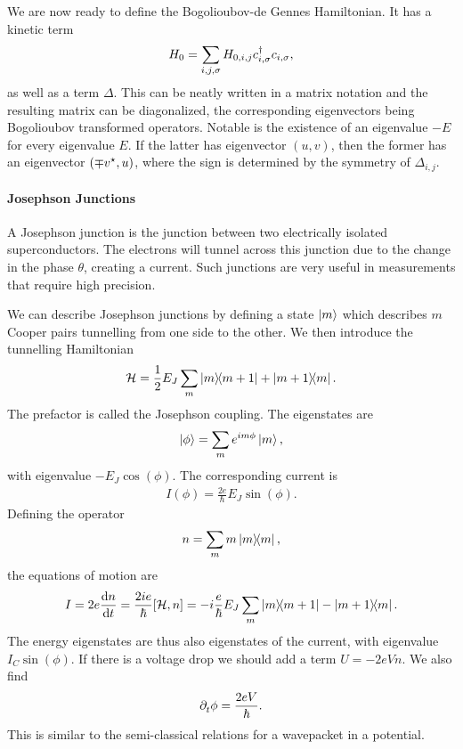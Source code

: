 We are now ready to define the Bogolioubov-de Gennes Hamiltonian. It has a kinetic term
\begin{align*}
	H_{0} = \sum\limits_{i, j, \sigma}H_{0, i, j}c_{i, \sigma}^{\dagger} c_{i, \sigma},
\end{align*}
as well as a term $\Delta$. This can be neatly written in a matrix notation and the resulting matrix can be diagonalized, the corresponding eigenvectors being Bogolioubov transformed operators. Notable is the existence of an eigenvalue $-E$ for every eigenvalue $E$. If the latter has eigenvector $(u, v)$, then the former has an eigenvector $(\mp v^{\star}, u)$, where the sign is determined by the symmetry of $\Delta_{i, j}$.

\paragraph{Josephson Junctions}
A Josephson junction is the junction between two electrically isolated superconductors. The electrons will tunnel across this junction due to the change in the phase $\theta$, creating a current. Such junctions are very useful in measurements that require high precision.

We can describe Josephson junctions by defining a state $\ket{m}$ which describes $m$ Cooper pairs tunnelling from one side to the other. We then introduce the tunnelling Hamiltonian
\begin{align*}
	\mathcal{H} = \frac{1}{2}E_{J}\sum\limits_{m}\op{m}{m + 1} + \op{m + 1}{m}.
\end{align*}
The prefactor is called the Josephson coupling. The eigenstates are
\begin{align*}
	\ket{\phi} = \sum\limits_{m}e^{im\phi}\ket{m},
\end{align*}
with eigenvalue $-E_{J}\cos(\phi)$. The corresponding current is
\begin{align*}
	I(\phi) = \frac{2e}{\hbar}E_{J}\sin(\phi).
\end{align*}
Defining the operator
\begin{align*}
	n = \sum\limits_{m}m\op{m},
\end{align*}
the equations of motion are
\begin{align*}
	I = 2e\dv{n}{t} = \frac{2ie}{\hbar}\comm{\ham}{n} = -i\frac{e}{\hbar}E_{J}\sum\limits_{m}\op{m}{m + 1} - \op{m + 1}{m}.
\end{align*}
The energy eigenstates are thus also eigenstates of the current, with eigenvalue $I_{C}\sin(\phi)$. If there is a voltage drop we should add a term $U = -2eVn$. We also find
\begin{align*}
	\partial^{}_{t}\phi = \frac{2eV}{\hbar}.
\end{align*}
This is similar to the semi-classical relations for a wavepacket in a potential.

